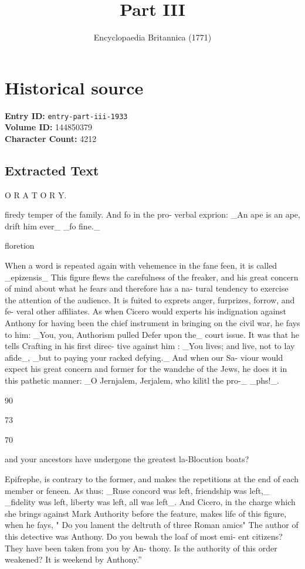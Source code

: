 \documentclass{article}
\title{Part III}
\date{Encyclopaedia Britannica (1771)}
\begin{document}
\maketitle

\section*{Historical source}
\textbf{Entry ID:} \texttt{entry-part-iii-1933} \\
\textbf{Volume ID:} 144850379 \\
\textbf{Character Count:} 4212

\subsection*{Extracted Text}
O R A T O R Y.

firedy temper of the family. And fo in the pro- verbal exprion: \_An ape is an ape, drift him ever\_
\_fo fine.\_

floretion

When a word is repeated again with vehemence in
the fane feen, it is called \_epizensis\_ This figure flews
the carefulness of the freaker, and his great concern
of mind about what he fears and therefore has a na-
tural tendency to exercise the attention of the audience.
It is fuited to exprets anger, furprizes, forrow, and fe-
veral other affiliates. As when Cicero would experts
his indignation against Anthony for having been the
chief instrument in bringing on the civil war, he fays
to him: \_You, you, Authorism pulled Defer upon the\_
court issue. It was that he tells Crafting in his first direc-
tive against him : \_You lives; and live, not to lay afide\_,
\_but to paying your racked defying.\_ And when our Sa-
viour would expect his great concern and former for
the wandche of the Jews, he does it in this pathetic
manner: \_O Jernjalem, Jerjalem, who kilitl the pro-\_
\_phs!\_.

90

73

70

and your ancestors have undergone the greatest la-Blocution
boats?

Epifrephe, is contrary to the former, and makes
the repetitions at the end of each member or feneen.
As thus: \_Ruse concord was left, friendship was left,\_
\_fidelity was left, liberty was left, all was left\_. And
Cicero, in the charge which she brings against Mark
Authority before the feature, makes life of this figure,
when he fays, " Do you lament the deltruth of
three Roman amics" The author of this detective
was Anthony. Do you bewah the loaf of most emi-
ent citizens? They have been taken from you by An-
thony. Is the authority of this order weakened? It
is weekend by Anthony.”
\end{document}
